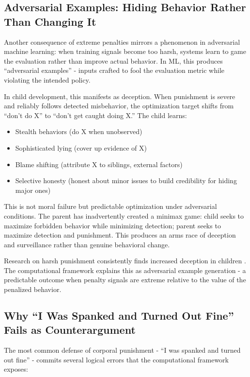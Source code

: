 \documentclass{article}
\begin{document}
\subsection{Adversarial Examples: Hiding Behavior Rather Than Changing It}

Another consequence of extreme penalties mirrors a phenomenon in adversarial machine learning: when training signals become too harsh, systems learn to game the evaluation rather than improve actual behavior. In ML, this produces ``adversarial examples'' - inputs crafted to fool the evaluation metric while violating the intended policy.

In child development, this manifests as deception. When punishment is severe and reliably follows detected misbehavior, the optimization target shifts from ``don't do X'' to ``don't get caught doing X.'' The child learns:

\begin{itemize}
\item Stealth behaviors (do X when unobserved)
\item Sophisticated lying (cover up evidence of X)
\item Blame shifting (attribute X to siblings, external factors)
\item Selective honesty (honest about minor issues to build credibility for hiding major ones)
\end{itemize}

This is not moral failure but predictable optimization under adversarial conditions. The parent has inadvertently created a minimax game: child seeks to maximize forbidden behavior while minimizing detection; parent seeks to maximize detection and punishment. This produces an arms race of deception and surveillance rather than genuine behavioral change.

Research on harsh punishment consistently finds increased deception in children \cite{talwar2011}. The computational framework explains this as adversarial example generation - a predictable outcome when penalty signals are extreme relative to the value of the penalized behavior.

\subsection{Why ``I Was Spanked and Turned Out Fine'' Fails as Counterargument}

The most common defense of corporal punishment - ``I was spanked and turned out fine'' - commits several logical errors that the computational framework exposes:
\end{document}
